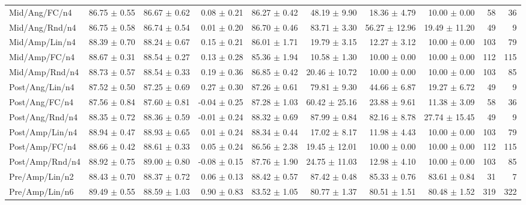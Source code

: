 \begin{table}[!t]
\begin{tabular}{lrrrrrrrrr}
Mid/Ang/FC/n4 & 86.75 $\pm$ 0.55 & 86.67 $\pm$ 0.62 & 0.08 $\pm$ 0.21 & 86.27 $\pm$ 0.42 & 48.19 $\pm$ 9.90 & 18.36 $\pm$ 4.79 & 10.00 $\pm$ 0.00 & 58 & 36 \\
Mid/Ang/Rnd/n4 & 86.75 $\pm$ 0.58 & 86.74 $\pm$ 0.54 & 0.01 $\pm$ 0.20 & 86.70 $\pm$ 0.46 & 83.71 $\pm$ 3.30 & 56.27 $\pm$ 12.96 & 19.49 $\pm$ 11.20 & 49 & 9 \\
Mid/Amp/Lin/n4 & 88.39 $\pm$ 0.70 & 88.24 $\pm$ 0.67 & 0.15 $\pm$ 0.21 & 86.01 $\pm$ 1.71 & 19.79 $\pm$ 3.15 & 12.27 $\pm$ 3.12 & 10.00 $\pm$ 0.00 & 103 & 79 \\
Mid/Amp/FC/n4 & 88.67 $\pm$ 0.31 & 88.54 $\pm$ 0.27 & 0.13 $\pm$ 0.28 & 85.36 $\pm$ 1.94 & 10.58 $\pm$ 1.30 & 10.00 $\pm$ 0.00 & 10.00 $\pm$ 0.00 & 112 & 115 \\
Mid/Amp/Rnd/n4 & 88.73 $\pm$ 0.57 & 88.54 $\pm$ 0.33 & 0.19 $\pm$ 0.36 & 86.85 $\pm$ 0.42 & 20.46 $\pm$ 10.72 & 10.00 $\pm$ 0.00 & 10.00 $\pm$ 0.00 & 103 & 85 \\
Post/Ang/Lin/n4 & 87.52 $\pm$ 0.50 & 87.25 $\pm$ 0.69 & 0.27 $\pm$ 0.30 & 87.26 $\pm$ 0.61 & 79.81 $\pm$ 9.30 & 44.66 $\pm$ 6.87 & 19.27 $\pm$ 6.72 & 49 & 9 \\
Post/Ang/FC/n4 & 87.56 $\pm$ 0.84 & 87.60 $\pm$ 0.81 & -0.04 $\pm$ 0.25 & 87.28 $\pm$ 1.03 & 60.42 $\pm$ 25.16 & 23.88 $\pm$ 9.61 & 11.38 $\pm$ 3.09 & 58 & 36 \\
Post/Ang/Rnd/n4 & 88.35 $\pm$ 0.72 & 88.36 $\pm$ 0.59 & -0.01 $\pm$ 0.24 & 88.32 $\pm$ 0.69 & 87.99 $\pm$ 0.84 & 82.16 $\pm$ 8.78 & 27.74 $\pm$ 15.45 & 49 & 9 \\
Post/Amp/Lin/n4 & 88.94 $\pm$ 0.47 & 88.93 $\pm$ 0.65 & 0.01 $\pm$ 0.24 & 88.34 $\pm$ 0.44 & 17.02 $\pm$ 8.17 & 11.98 $\pm$ 4.43 & 10.00 $\pm$ 0.00 & 103 & 79 \\
Post/Amp/FC/n4 & 88.66 $\pm$ 0.42 & 88.61 $\pm$ 0.33 & 0.05 $\pm$ 0.24 & 86.56 $\pm$ 2.38 & 19.45 $\pm$ 12.01 & 10.00 $\pm$ 0.00 & 10.00 $\pm$ 0.00 & 112 & 115 \\
Post/Amp/Rnd/n4 & 88.92 $\pm$ 0.75 & 89.00 $\pm$ 0.80 & -0.08 $\pm$ 0.15 & 87.76 $\pm$ 1.90 & 24.75 $\pm$ 11.03 & 12.98 $\pm$ 4.10 & 10.00 $\pm$ 0.00 & 103 & 85 \\
Pre/Amp/Lin/n2 & 88.43 $\pm$ 0.70 & 88.37 $\pm$ 0.72 & 0.06 $\pm$ 0.13 & 88.42 $\pm$ 0.57 & 87.42 $\pm$ 0.48 & 85.33 $\pm$ 0.76 & 83.61 $\pm$ 0.84 & 31 & 7 \\
Pre/Amp/Lin/n6 & 89.49 $\pm$ 0.55 & 88.59 $\pm$ 1.03 & 0.90 $\pm$ 0.83 & 83.52 $\pm$ 1.05 & 80.77 $\pm$ 1.37 & 80.51 $\pm$ 1.51 & 80.48 $\pm$ 1.52 & 319 & 322 \\

\end{tabular}
\end{table}
